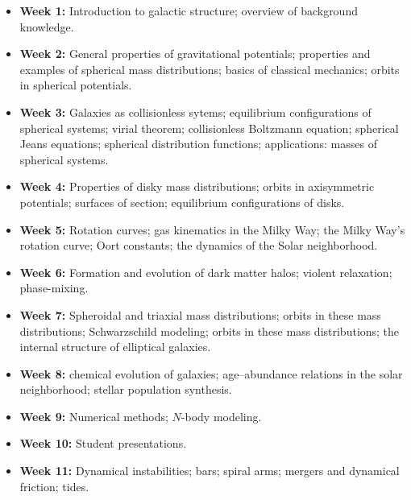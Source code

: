 \documentclass{article}
\begin{document}
\begin{itemize}

  \item {\bf Week 1:} Introduction to galactic structure; overview of
    background knowledge.

  \item {\bf Week 2:} General properties of gravitational potentials;
    properties and examples of spherical mass distributions; basics of
    classical mechanics; orbits in spherical potentials.

  \item {\bf Week 3:} Galaxies as collisionless sytems; equilibrium
    configurations of spherical systems; virial theorem; collisionless
    Boltzmann equation; spherical Jeans equations; spherical
    distribution functions; applications: masses of spherical systems.

  \item {\bf Week 4:} Properties of disky mass distributions; orbits
    in axisymmetric potentials; surfaces of section; equilibrium
    configurations of disks.

  \item {\bf Week 5:} Rotation curves; gas kinematics in the Milky
    Way; the Milky Way's rotation curve; Oort constants; the dynamics
    of the Solar neighborhood.

  \item {\bf Week 6:} Formation and evolution of dark matter halos;
    violent relaxation; phase-mixing.

  \item {\bf Week 7:} Spheroidal and triaxial mass distributions;
    orbits in these mass distributions; Schwarzschild modeling; orbits
    in these mass distributions; the internal structure of elliptical
    galaxies.

  \item {\bf Week 8:} chemical evolution of galaxies; age--abundance
    relations in the solar neighborhood; stellar population synthesis.

  \item {\bf Week 9:} Numerical methods; $N$-body modeling.

  \item {\bf Week 10:} Student presentations.

  \item {\bf Week 11:} Dynamical instabilities; bars; spiral arms;
    mergers and dynamical friction; tides.

\end{itemize}
\end{document}
